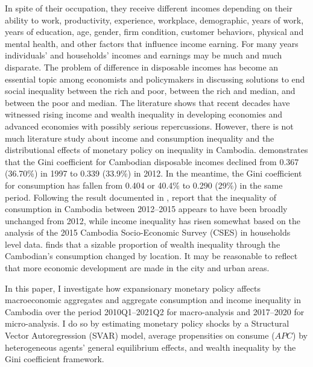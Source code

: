 \documentclass[11pt,letterpaper]{article}
\begin{document}
In spite of their occupation, they receive different incomes depending on their ability to work, productivity, experience, workplace, demographic, years of work, years of education, age, gender, firm condition, customer behaviors, physical and mental health, and other factors that influence income earning. For many years individuals' and households' incomes and earnings may be much and much disparate. The problem of difference in disposable incomes has become an essential topic among economists and policymakers in discussing solutions to end social inequality between the rich and poor, between the rich and median, and between the poor and median. The literature shows that recent decades have witnessed rising income and wealth inequality in developing economies \cite{Cornia2012, UNDP2013} and advanced economies \cite{Bastagli2012, Piketty2013} with possibly serious repercussions. However, there is not much literature study about income and consumption inequality and the distributional effects of monetary policy on inequality in Cambodia. \citet{Solt2020} demonstrates that the Gini coefficient for Cambodian disposable incomes declined from 0.367 (36.70\%) in 1997 to 0.339 (33.9\%) in 2012. In the meantime, the Gini coefficient for consumption has fallen from 0.404 or 40.4\% to 0.290 (29\%) in the same period. Following the result documented in \citet{Solt2020}, \citet{Hansen2019} report that the inequality of consumption in Cambodia between 2012--2015 appears to have been broadly unchanged from 2012, while income inequality has risen somewhat based on the analysis of the 2015 Cambodia Socio-Economic Survey (CSES) in households level data. \citet{Fujii2013} finds that a sizable proportion of wealth inequality through the Cambodian's consumption changed by location. It may be reasonable to reflect that more economic development are made in the city and urban areas. 

In this paper, I investigate how expansionary monetary policy affects macroeconomic aggregates and aggregate consumption and income inequality in Cambodia over the period 2010Q1--2021Q2 for macro-analysis and 2017--2020 for micro-analysis. I do so by estimating monetary policy shocks by a Structural Vector Autoregression (SVAR) model, average propensities on consume ($APC$) by heterogeneous agents' general equilibrium effects, and wealth inequality by the Gini coefficient framework. 
\end{document}
